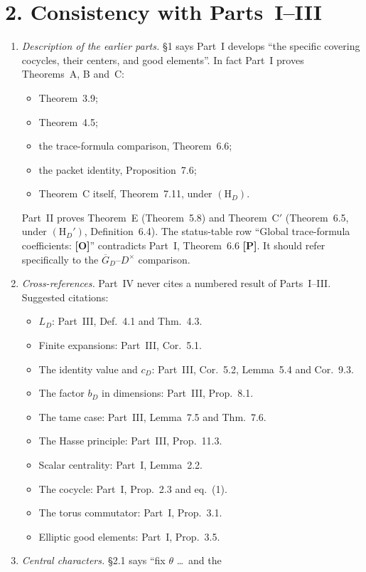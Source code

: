 \documentclass[11pt]{article}
\newcommand{\GDb}{\overline G_D}
\theoremstyle{definition}
\begin{document}
\section*{2. Consistency with Parts~I--III}
\begin{enumerate}[label=(\arabic*)]
\item \emph{Description of the earlier parts.} \S1 says Part~I develops
``the specific covering cocycles, their centers, and good elements''. In
fact Part~I proves Theorems~A, B and~C:
\begin{itemize}
\item Theorem~3.9;
\item Theorem~4.5;
\item the trace-formula comparison, Theorem~6.6;
\item the packet identity, Proposition~7.6;
\item Theorem~C itself, Theorem~7.11, under $(\mathrm H_D)$.
\end{itemize}
Part~II proves Theorem~E (Theorem~5.8) and Theorem~C$'$ (Theorem~6.5,
under $(\mathrm H_D')$, Definition~6.4). The status-table row ``Global
trace-formula coefficients: \textbf{[O]}'' contradicts Part~I,
Theorem~6.6 \textbf{[P]}. It should refer specifically to the
$\GDb$--$D^\times$ comparison.
\item \emph{Cross-references.} Part~IV never cites a numbered result of
Parts~I--III. Suggested citations:
\begin{itemize}
\item $L_D$: Part~III, Def.~4.1 and Thm.~4.3.
\item Finite expansions: Part~III, Cor.~5.1.
\item The identity value and $c_D$: Part~III, Cor.~5.2, Lemma~5.4 and
Cor.~9.3.
\item The factor $b_D$ in dimensions: Part~III, Prop.~8.1.
\item The tame case: Part~III, Lemma~7.5 and Thm.~7.6.
\item The Hasse principle: Part~III, Prop.~11.3.
\item Scalar centrality: Part~I, Lemma~2.2.
\item The cocycle: Part~I, Prop.~2.3 and eq.~(1).
\item The torus commutator: Part~I, Prop.~3.1.
\item Elliptic good elements: Part~I, Prop.~3.5.
\end{itemize}
\item \emph{Central characters.} \S2.1 says ``fix $\theta$ \ldots\ and the

\end{enumerate}
\end{document}
